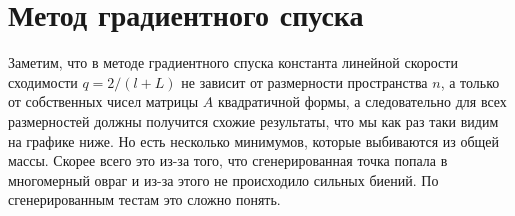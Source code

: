 \section{Метод градиентного спуска}

Заметим, что в методе градиентного спуска константа линейной скорости сходимости $q = 2/(l + L)$ не зависит
от размерности пространства $n$, а только от собственных чисел матрицы $A$ квадратичной формы, а следовательно
для всех размерностей должны получится схожие результаты, что мы как раз таки видим на графике ниже.
Но есть несколько минимумов, которые выбиваются из общей массы.
 Скорее всего это из-за того, что сгенерированная
точка попала в многомерный овраг и из-за этого не происходило сильных биений. По сгенерированным
тестам это сложно понять.



\begin{flushleft}
\end{flushleft}


\begin{flushleft}
\end{flushleft}


